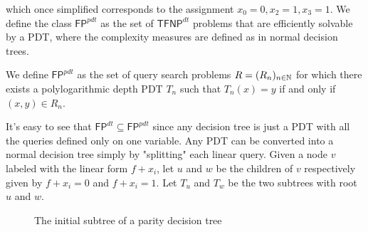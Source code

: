 which once simplified corresponds to the assignment $x_0 = 0, x_2 = 1, x_3 = 1$. We define the class $\mathsf{FP}^{pdt}$ as the set of $\mathsf{TFNP}^{dt}$ problems that are efficiently solvable by a PDT, where the complexity measures are defined as in normal decision trees.

\begin{definition}
    We define $\mathsf{FP}^{pdt}$ as the set of query search problems $R = (R_n)_{n \in \mathbb{N}}$ for which there exists a polylogarithmic depth PDT $T_n$ such that $T_n(x) = y$ if and only if $(x,y) \in R_n$.
\end{definition}

It's easy to see that $\mathsf{FP}^{dt} \subseteq \mathsf{FP}^{pdt}$ since any decision tree is just a PDT with all the queries defined only on one variable. Any PDT can be converted into a normal decision tree simply by "splitting" each linear query. Given a node $v$ labeled with the linear form $f + x_i$, let $u$ and $w$ be the children of $v$ respectively given by $f + x_i = 0$ and $f+x_i = 1$. Let $T_u$ and $T_w$ be the two subtrees with root $u$ and $w$.

\newpage

\begin{figure}[H]
    \centering


    \caption{The initial subtree of a parity decision tree}
\end{figure}

